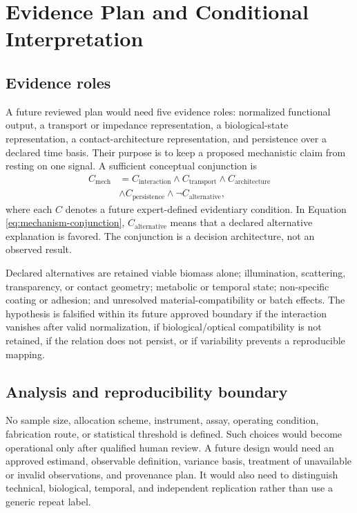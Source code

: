 \documentclass[conference]{IEEEtran}
\begin{document}
\section{Evidence Plan and Conditional Interpretation}

\subsection{Evidence roles}

A future reviewed plan would need five evidence roles: normalized functional output, a transport or impedance representation, a biological-state representation, a contact-architecture representation, and persistence over a declared time basis. Their purpose is to keep a proposed mechanistic claim from resting on one signal. A sufficient conceptual conjunction is
\begin{equation}
  \begin{aligned}
    C_{\mathrm{mech}} &= C_{\mathrm{interaction}} \wedge
    C_{\mathrm{transport}} \wedge C_{\mathrm{architecture}}\\
    &\wedge C_{\mathrm{persistence}} \wedge
    \neg C_{\mathrm{alternative}},
  \end{aligned}
  \label{eq:mechanism-conjunction}
\end{equation}
where each $C$ denotes a future expert-defined evidentiary condition. In Equation \eqref{eq:mechanism-conjunction}, $C_{\mathrm{alternative}}$ means that a declared alternative explanation is favored. The conjunction is a decision architecture, not an observed result.

Declared alternatives are retained viable biomass alone; illumination, scattering, transparency, or contact geometry; metabolic or temporal state; non-specific coating or adhesion; and unresolved material-compatibility or batch effects. The hypothesis is falsified within its future approved boundary if the interaction vanishes after valid normalization, if biological/optical compatibility is not retained, if the relation does not persist, or if variability prevents a reproducible mapping.

\subsection{Analysis and reproducibility boundary}

No sample size, allocation scheme, instrument, assay, operating condition, fabrication route, or statistical threshold is defined. Such choices would become operational only after qualified human review. A future design would need an approved estimand, observable definition, variance basis, treatment of unavailable or invalid observations, and provenance plan. It would also need to distinguish technical, biological, temporal, and independent replication rather than use a generic repeat label.
\end{document}
